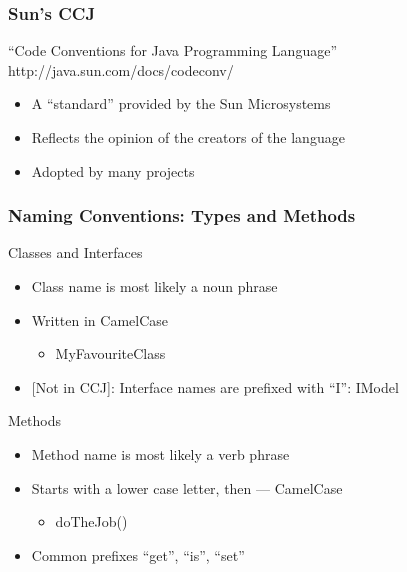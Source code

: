 \documentclass[screen]{beamer}
\begin{document}
\begin{frame}[fragile]
\frametitle{Sun's CCJ}%
%
\begin{block}
	{``Code Conventions for Java\texttrademark{} Programming Language''}
	http://java.sun.com/docs/codeconv/
	\begin{itemize}
		\item A ``standard'' provided by the Sun Microsystems 
		\item Reflects the opinion of the creators of the language
		\item Adopted by many projects
	\end{itemize}
\end{block}
\end{frame}


\begin{frame}[fragile]
\frametitle{Naming Conventions: Types and Methods}%
%
\begin{block}{Classes and Interfaces}
	\begin{itemize}
		\item Class name is most likely a noun phrase
		\item Written in CamelCase
			\begin{itemize}
				\item MyFavouriteClass
			\end{itemize}
		\item{} [Not in CCJ]: Interface names are prefixed with ``I'': IModel
	\end{itemize}
\end{block}
\begin{block}{Methods}
	\begin{itemize}
		\item Method name is most likely a verb phrase
		\item Starts with a lower case letter, then --- CamelCase
			\begin{itemize}
				\item doTheJob()
			\end{itemize}
		\item{} Common prefixes ``get'', ``is'', ``set''
	\end{itemize}
\end{block}
\end{frame}
\end{document}
